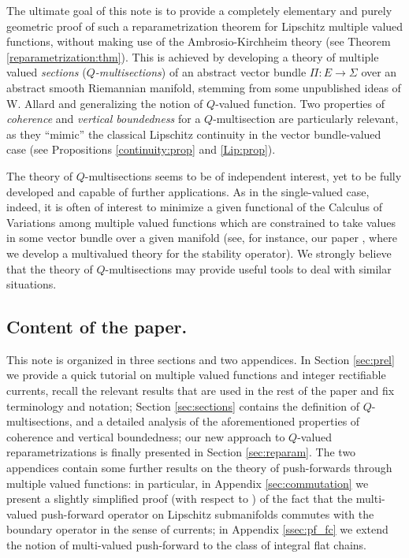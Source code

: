 \documentclass[a4paper,11pt,reqno]{amsart}
\theoremstyle{definition}
\numberwithin{equation}{section}
\numberwithin{subsection}{section}
\begin{document}
The ultimate goal of this note is to provide a completely elementary and purely geometric proof of such a reparametrization theorem for Lipschitz multiple valued functions, without making use of the Ambrosio-Kirchheim theory (see Theorem \ref{reparametrization:thm}). This is achieved by developing a theory of multiple valued \emph{sections} (\emph{$Q$-multisections}) of an abstract vector bundle $\Pi \colon E \to \Sigma$ over an abstract smooth Riemannian manifold, stemming from some unpublished ideas of W. Allard \cite{Allard} and generalizing the notion of $Q$-valued function. Two properties of \emph{coherence} and \emph{vertical boundedness} for a $Q$-multisection are particularly relevant, as they ``mimic'' the classical Lipschitz continuity in the vector bundle-valued case (see Propositions \ref{continuity:prop} and \ref{Lip:prop}).

The theory of $Q$-multisections seems to be of independent interest, yet to be fully developed and capable of further applications. As in the single-valued case, indeed, it is often of interest to minimize a given functional of the Calculus of Variations among multiple valued functions which are constrained to take values in some vector bundle over a given manifold (see, for instance, our paper \cite{SS17b}, where we develop a multivalued theory for the stability operator). We strongly believe that the theory of $Q$-multisections may provide useful tools to deal with similar situations.

\subsection{Content of the paper.}

This note is organized in three sections and two appendices. In Section \ref{sec:prel} we provide a quick tutorial on multiple valued functions and integer rectifiable currents, recall the relevant results that are used in the rest of the paper and fix terminology and notation; Section \ref{sec:sections} contains the definition of $Q$-multisections, and a detailed analysis of the aforementioned properties of coherence and vertical boundedness; our new approach to $Q$-valued reparametrizations is finally presented in Section \ref{sec:reparam}. The two appendices contain some further results on the theory of push-forwards through multiple valued functions: in particular, in Appendix \ref{sec:commutation} we present a slightly simplified proof (with respect to \cite[Theorem 2.1]{DLS13a}) of the fact that the multi-valued push-forward operator on Lipschitz submanifolds commutes with the boundary operator in the sense of currents; in Appendix \ref{ssec:pf_fc} we extend the notion of multi-valued push-forward to the class of integral flat chains.
\end{document}
